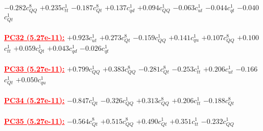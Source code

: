 \documentclass{article}
\begin{document}
{$-0.282$}{\rm $c_{QQ}^{8}$}
{$+0.235$}{\rm $c_{tt}^{1}$}
{$-0.187$}{\rm $c_{Qt}^{8}$}
{$+0.137$}{\rm $c_{qd}^{1}$}
{$+0.094$}{\rm $c_{QQ}^{1}$}
{$-0.063$}{\rm $c_{ut}^{1}$}
{$-0.044$}{\rm $c_{qt}^{1}$}
{$-0.040$}{\rm $c_{Qt}^{1}$}
 \nonumber \\ \nonumber \\
\noindent \textcolor{red}{\underline{\bf{PC32} (5.27e-11):}}
{$+0.923$}{\rm $c_{ut}^{1}$}
{$+0.273$}{\rm $c_{Qt}^{8}$}
{$-0.159$}{\rm $c_{QQ}^{1}$}
{$+0.141$}{\rm $c_{qu}^{1}$}
{$+0.107$}{\rm $c_{QQ}^{8}$}
{$+0.100$}{\rm $c_{tt}^{1}$}
{$+0.059$}{\rm $c_{Qt}^{1}$}
{$+0.043$}{\rm $c_{qd}^{1}$}
{$-0.026$}{\rm $c_{qt}^{1}$}
 \nonumber \\ \nonumber \\
\noindent \textcolor{red}{\underline{\bf{PC33} (5.27e-11):}}
{$+0.799$}{\rm $c_{QQ}^{1}$}
{$+0.383$}{\rm $c_{QQ}^{8}$}
{$-0.281$}{\rm $c_{Qt}^{8}$}
{$-0.253$}{\rm $c_{tt}^{1}$}
{$+0.206$}{\rm $c_{ut}^{1}$}
{$-0.166$}{\rm $c_{Qt}^{1}$}
{$+0.050$}{\rm $c_{qu}^{1}$}
 \nonumber \\ \nonumber \\
\noindent \textcolor{red}{\underline{\bf{PC34} (5.27e-11):}}
{$-0.847$}{\rm $c_{Qt}^{1}$}
{$-0.326$}{\rm $c_{QQ}^{1}$}
{$+0.313$}{\rm $c_{QQ}^{8}$}
{$+0.206$}{\rm $c_{tt}^{1}$}
{$-0.188$}{\rm $c_{Qt}^{8}$}
 \nonumber \\ \nonumber \\
\noindent \textcolor{red}{\underline{\bf{PC35} (5.27e-11):}}
{$-0.564$}{\rm $c_{Qt}^{8}$}
{$+0.515$}{\rm $c_{QQ}^{8}$}
{$+0.490$}{\rm $c_{Qt}^{1}$}
{$+0.351$}{\rm $c_{tt}^{1}$}
{$-0.232$}{\rm $c_{QQ}^{1}$}
 \nonumber \\ \nonumber \\
\end{document}

